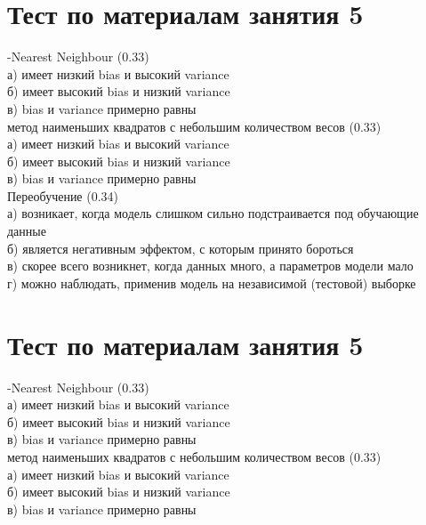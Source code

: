 \documentclass[10pt,a4paper]{article}
\author{Nikolay Anokhin}
\begin{document}
\thispagestyle{empty}

\section*{Тест по материалам занятия 5}

-Nearest Neighbour (0.33) \\
а) имеет низкий bias и высокий variance \\
б) имеет высокий bias и низкий variance \\
в) bias и variance примерно равны \\

\noindent метод наименьших квадратов с небольшим количеством весов (0.33) \\
а) имеет низкий bias и высокий variance \\
б) имеет высокий bias и низкий variance \\
в) bias и variance примерно равны \\

\noindent Переобучение (0.34) \\
а) возникает, когда модель слишком сильно подстраивается под обучающие данные \\
б) является негативным эффектом, с которым принято бороться \\
в) скорее всего возникнет, когда данных много, а параметров модели мало \\
г) можно наблюдать, применив модель на независимой (тестовой) выборке \\

\section*{Тест по материалам занятия 5}

-Nearest Neighbour (0.33) \\
а) имеет низкий bias и высокий variance \\
б) имеет высокий bias и низкий variance \\
в) bias и variance примерно равны \\

\noindent метод наименьших квадратов с небольшим количеством весов (0.33) \\
а) имеет низкий bias и высокий variance \\
б) имеет высокий bias и низкий variance \\
в) bias и variance примерно равны \\
\end{document}
